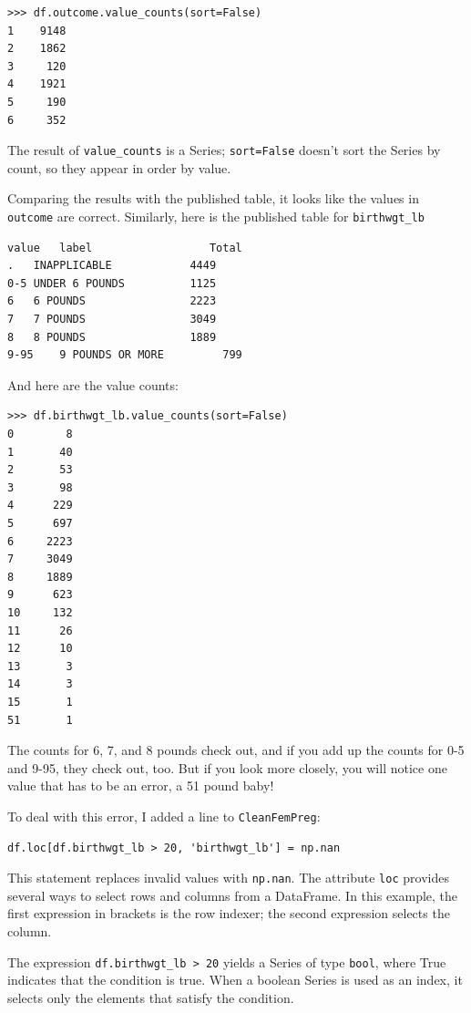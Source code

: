 \documentclass[12pt]{book}
\begin{document}
\begin{verbatim}
>>> df.outcome.value_counts(sort=False)
1    9148
2    1862
3     120
4    1921
5     190
6     352
\end{verbatim}

The result of \verb"value_counts" is a Series;
\verb"sort=False" doesn't sort the Series by count, so they
appear in order by value.

Comparing the results with the published table, it looks like the
values in {\tt outcome} are correct.  Similarly, here is the published
table for \verb"birthwgt_lb"

\begin{verbatim}
value	label                  Total
.	INAPPLICABLE            4449
0-5	UNDER 6 POUNDS          1125
6	6 POUNDS                2223
7	7 POUNDS                3049
8	8 POUNDS                1889
9-95	9 POUNDS OR MORE         799
\end{verbatim}

And here are the value counts:

\begin{verbatim}
>>> df.birthwgt_lb.value_counts(sort=False)
0        8
1       40
2       53
3       98
4      229
5      697
6     2223
7     3049
8     1889
9      623
10     132
11      26
12      10
13       3
14       3
15       1
51       1
\end{verbatim}

The counts for 6, 7, and 8 pounds check out, and if you add
up the counts for 0-5 and 9-95, they check out, too.  But
if you look more closely, you will notice one value that has to be
an error, a 51 pound baby!

To deal with this error, I added a line to {\tt CleanFemPreg}:

\begin{verbatim}
df.loc[df.birthwgt_lb > 20, 'birthwgt_lb'] = np.nan
\end{verbatim}

This statement replaces invalid values with {\tt np.nan}.
The attribute {\tt loc} provides several ways to select
rows and columns from a DataFrame.  In this example, the
first expression in brackets is the row indexer; the second
expression selects the column.

The expression \verb"df.birthwgt_lb > 20" yields a Series of type
{\tt bool}, where True indicates that the condition is true.  When a
boolean Series is used as an index, it selects only the elements that
satisfy the condition.
  
\end{document}
